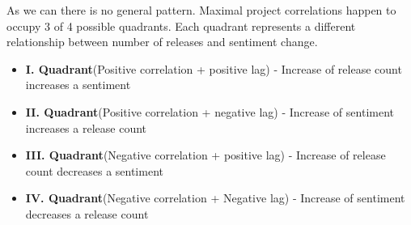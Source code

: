 As we can there is no general pattern. Maximal project correlations happen to occupy 3 of 4 possible quadrants. Each quadrant represents a different relationship between number of releases and sentiment change.

\begin{itemize}
  \item \textbf{I. Quadrant}(Positive correlation + positive lag) - Increase of release count increases a sentiment
  \item \textbf{II. Quadrant}(Positive correlation + negative lag) - Increase of sentiment increases a release count
  \item \textbf{III. Quadrant}(Negative correlation + positive lag) - Increase of release count decreases a sentiment
  \item \textbf{IV. Quadrant}(Negative correlation + Negative lag) - Increase of sentiment decreases a release count
\end{itemize}
